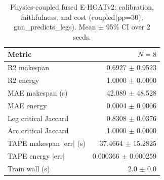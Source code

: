 \begin{table}[t]
\centering
\caption{Physics-coupled fused E-HGATv2: calibration, faithfulness, and cost (coupled(pp=30), gnn_predicts_legs). Mean $\pm$ 95\% CI over 2 seeds.}
\label{tab:fused-coupled}
\begin{tabular}{lr}
\toprule
Metric & $N=8$ \\
\midrule
R2 makespan & 0.6927 $\pm$ 0.9523 \\
R2 energy & 1.0000 $\pm$ 0.0000 \\
MAE makespan (s) & 42.089 $\pm$ 48.528 \\
MAE energy & 0.0004 $\pm$ 0.0006 \\
Leg critical Jaccard & 0.8308 $\pm$ 0.0376 \\
Arc critical Jaccard & 1.0000 $\pm$ 0.0000 \\
TAPE makespan |err| (s) & 37.4664 $\pm$ 15.2825 \\
TAPE energy |err| & 0.000366 $\pm$ 0.000259 \\
Train wall (s) & 2.0 $\pm$ 0.0 \\
\bottomrule
\end{tabular}
\end{table}
